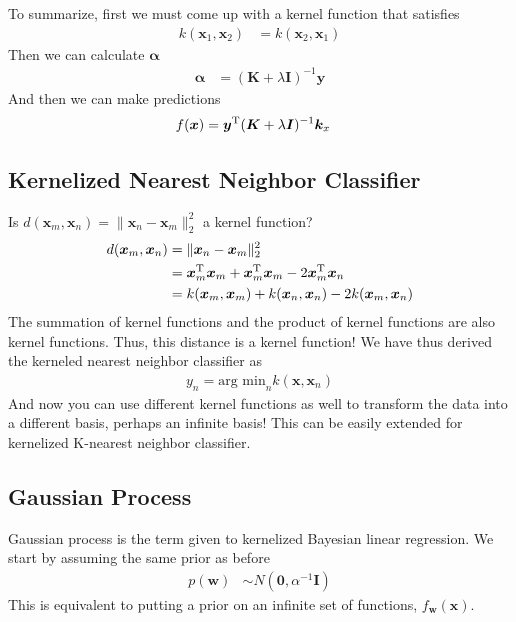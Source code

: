 \documentclass[11pt]{article}
\newcommand{\vct}[1]{\boldsymbol{#1}} %
\newcommand{\mat}[1]{\boldsymbol{#1}} %
\newcommand{\T}{^{\textrm T}} %
\begin{document}
To summarize, first we must come up with a kernel function that satisfies
\begin{align*}
k(\vct{x}_1, \vct{x}_2) &= k(\vct{x}_2, \vct{x}_1)
\end{align*} 
Then we can calculate $\vct{\alpha}$
\begin{align*}
\vct{\alpha} &= (\mat{K} + \lambda \mat{I})^{-1}\vct{y}
\end{align*} 
And then we can make predictions
\begin{align*}
f(\vct{x}) &=\vct{y}\T(\mat{K} + \lambda \mat{I})^{-1} \vct{k}_x
\end{align*}

\subsection{Kernelized Nearest Neighbor Classifier}
Is $d(\vct{x}_m, \vct{x}_n) = \|\vct{x}_n - \vct{x}_m\|_2^2$ a kernel function?
\begin{align*}
d(\vct{x}_m, \vct{x}_n) &= \|\vct{x}_n - \vct{x}_m\|_2^2\\
&= \vct{x}_m\T\vct{x}_m + \vct{x}_m\T\vct{x}_m - 2\vct{x}_m\T\vct{x}_n\\
&= k(\vct{x}_m,\vct{x}_m) + k(\vct{x}_n, \vct{x}_n) - 2k(\vct{x}_m,\vct{x}_n)\\
\end{align*}
The summation of kernel functions and the product of kernel functions are also kernel functions. Thus, this distance is a kernel function! We have thus derived the kerneled nearest neighbor classifier as
\begin{align*}
y_n = \text{arg min}_n k(\vct{x}, \vct{x}_n)
\end{align*}
And now you can use different kernel functions as well to transform the data into a different basis, perhaps an infinite basis! This can be easily extended for kernelized K-nearest neighbor classifier.

\subsection{Gaussian Process}
Gaussian process is the term given to kernelized Bayesian linear regression. We start by assuming the same prior as before
\begin{align*}
p(\vct{w}) &\sim N(\vct{0}, \alpha^{-1}\mat{I})
\end{align*}
This is equivalent to putting a prior on an infinite set of functions, $f_{\vct{w}}(\vct{x})$.
\end{document}
